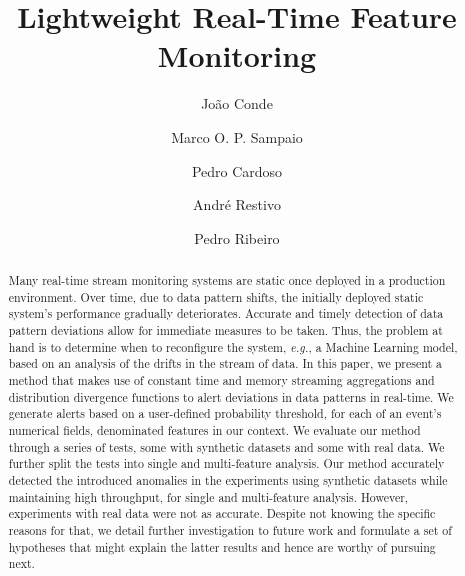 \documentclass[sigconf]{acmart}
\begin{document}
%
\title{Lightweight Real-Time Feature Monitoring}

%
\author[Conde]{João Conde}

\author[Sampaio]{Marco O. P. Sampaio}

\author[Cardoso]{Pedro Cardoso}

\author[Restivo]{André Restivo}

\author[Ribeiro]{Pedro Ribeiro}


    


%

%
\begin{abstract}
Many real-time stream monitoring systems are static once deployed in a production environment. Over time, due to data pattern shifts, the initially deployed static system's performance gradually deteriorates. Accurate and timely detection of data pattern deviations allow for immediate measures to be taken. Thus, the problem at hand is to determine when to reconfigure the system, \textit{e.g.}, a Machine Learning model, based on an analysis of the drifts in the stream of data. In this paper, we present a method that makes use of constant time and memory streaming aggregations and distribution divergence functions to alert deviations in data patterns in real-time. We generate alerts based on a user-defined probability threshold, for each of an event's numerical fields, denominated features in our context. We evaluate our method through a series of tests, some with synthetic datasets and some with real data. We further split the tests into single and multi-feature analysis. Our method accurately detected the introduced anomalies in the experiments using synthetic datasets while maintaining high throughput, for single and multi-feature analysis. However, experiments with real data were not as accurate. Despite not knowing the specific reasons for that, we detail further investigation to future work and formulate a set of hypotheses that might explain the latter results and hence are worthy of pursuing next.
\end{abstract}
\end{document}
